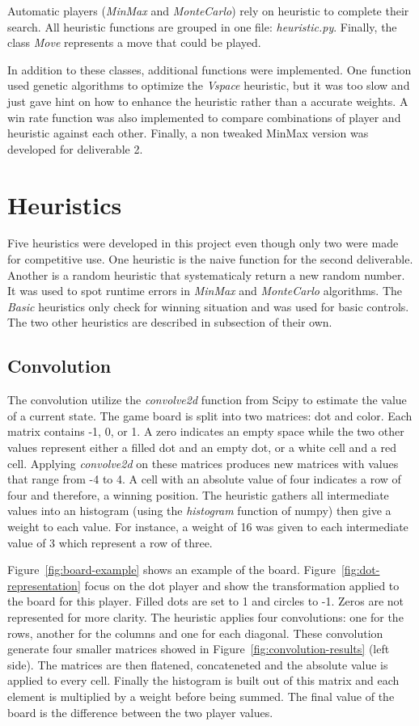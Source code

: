 \documentclass[runningheads]{llncs}
\begin{document}
Automatic players (\textit{MinMax} and
\textit{MonteCarlo}) rely on heuristic to complete
their search. All heuristic functions are grouped
in one file: \textit{heuristic.py}.
Finally, the class \textit{Move} represents a move
that could be played.

In addition to these classes, additional functions
were implemented. One function used genetic
algorithms to optimize the \textit{Vspace}
heuristic, but it was too slow and just gave hint
on how to enhance the heuristic rather than a
accurate weights.  A win rate function was also
implemented to compare combinations of player and
heuristic against each other. Finally, a non
tweaked MinMax version was developed for
deliverable 2.

\section{Heuristics}
Five heuristics were developed in this project
even though only two were made for competitive
use. One heuristic is the naive function for the
second deliverable. Another is a random heuristic
that systematicaly return a new random number. It
was used to spot runtime errors in \textit{MinMax} and
\textit{MonteCarlo} algorithms. The \textit{Basic}
heuristics only check for winning situation and
was used for basic controls.
The two other heuristics are described in
subsection of their own.

\subsection{Convolution}
The convolution utilize the \textit{convolve2d} function
from Scipy to estimate the value of a current
state.
The game board is split into two matrices: dot and
color. Each matrix contains -1, 0, or 1. A zero
indicates an empty space while the two other values
represent either a filled dot and an empty dot, or
a white cell and a red cell.
Applying \textit{convolve2d} on these matrices
produces new matrices with values that range from
-4 to 4. A cell with an absolute value of four indicates a row
of four and therefore, a winning position.
The heuristic gathers all intermediate values into
an histogram (using the \textit{histogram}
function of numpy) then give a weight to each
value. For instance, a weight of 16 was given to
each intermediate value of 3 which represent a row
of three.

Figure~\ref{fig:board-example} shows an example of
the board. Figure~\ref{fig:dot-representation}
focus on the dot player and show the
transformation applied to the board for this
player. Filled dots are set to 1 and circles to
-1. Zeros are not represented for more clarity.
The heuristic applies four convolutions: one for
the rows, another for the columns and one for each
diagonal. These convolution generate four smaller
matrices showed in
Figure~\ref{fig:convolution-results} (left side).
The matrices are then flatened, concateneted and the
absolute value is applied to every cell. Finally
the histogram is built out of this matrix and each
element is multiplied by a weight before being
summed.  The final
value of the board is the difference between the
two player values.
\end{document}
